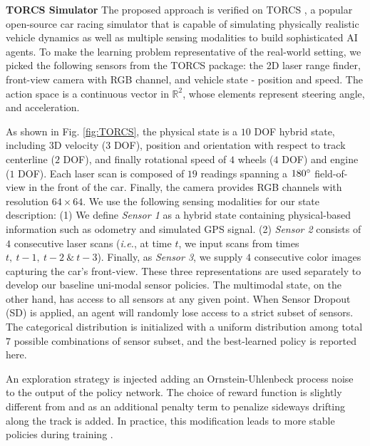 \documentclass[../thesis.tex]{subfiles}
\begin{document}
\textbf{TORCS Simulator}
The proposed approach is verified on TORCS \cite{wymann2000torcs}, a popular open-source car racing simulator that is capable of simulating physically realistic vehicle dynamics as well as multiple sensing modalities \cite{GymTORCS} to build sophisticated AI agents. To make the learning problem representative of the real-world setting, we picked the following sensors from the TORCS package: the 2D laser range finder, front-view camera with RGB channel, and vehicle state - position and speed. The action space is a continuous vector in $\mathbb{R}^2$, whose elements represent steering angle, and acceleration.
 
As shown in Fig. \ref{fig:TORCS}, the physical state is a $10$ DOF hybrid state, including $3$D velocity ($3$ DOF), position and orientation with respect to track centerline ($2$ DOF), and finally rotational speed of $4$ wheels ($4$ DOF) and engine ($1$ DOF). Each laser scan is composed of $19$ readings spanning a $180\degree$ field-of-view in the front of the car. Finally, the camera provides RGB channels with resolution $64 \times 64$. We use the following sensing modalities for our state description: (1) We define \emph{Sensor 1} as a hybrid state containing physical-based information such as odometry and simulated GPS signal. (2) \emph{Sensor 2} consists of $4$ consecutive laser scans (\textit{i.e.}, at time $t$, we input scans from times $t,~ t-1,~t-2~\&~t-3$). Finally, as \emph{Sensor 3}, we supply $4$ consecutive color images capturing the car's front-view. These three representations are used separately to develop our baseline uni-modal sensor policies. The multimodal state, on the other hand, has access to all sensors at any given point. When Sensor Dropout (SD) is applied, an agent will randomly lose access to a strict subset of sensors. The categorical distribution is initialized with a uniform distribution among total $7$ possible combinations of sensor subset, and the best-learned policy is reported here.
 
An exploration strategy is injected adding an Ornstein-Uhlenbeck process noise \cite{uhlenbeck1930theory} to the output of the policy network. The choice of reward function is slightly different from  \citet{DBLP:journals/corr/LillicrapHPHETS15} and \citet{A3C} as an additional penalty term to penalize sideways drifting along the track is added. In practice, this modification leads to more stable policies during training \cite{BenLau16}.
 
\end{document}
